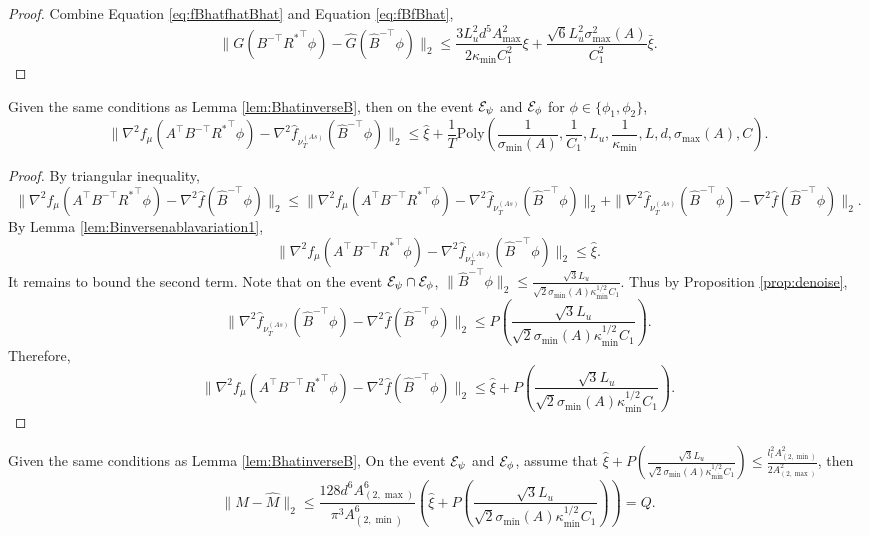 \begin{proof}
Combine Equation \eqref{eq:fBhatfhatBhat} and Equation \eqref{eq:fBfBhat},
\[
\|G(B^{-\top}{R^*}^{\top}\phi) - \hat{G}(\hat{B}^{-\top}\phi)\|_2
\le 
\frac{3L_u^2d^5A^2_{\max}}{2\kappa_{\min}C_1^2}\xi + \frac{\sqrt{6}L_u^2\sigma_{\max}^2(A)}{C_1^2}\bar{\xi}.
\]
\end{proof}

\begin{lemma}
\label{lem:Binversenablavariation2}
Given the same conditions as Lemma \ref{lem:BhatinverseB}, then on the event $\mathcal{E}_{\psi}$ and $\mathcal{E}_{\phi}$ for $\phi \in \{\phi_1, \phi_2\}$,
\[
\|\nabla^2 f_{\mu}(A^{\top}B^{-\top}{R^*}^{\top}\phi) - \nabla^2 \hat{f}_{\nu_T^{(As)}}(\hat{B}^{-\top}\phi)  \|_2 
\le
 \hat{\xi}
+
\frac{1}{T}\text{Poly}\left(\frac{1}{\sigma_{\min}(A)}, \frac{1}{C_1}, L_u, \frac{1}{\kappa_{\min}}, L, d, \sigma_{\max}(A), C\right).
\]
\end{lemma}
\begin{proof}
By triangular inequality, 
\[
\|\nabla^2 f_{\mu}(A^{\top}B^{-\top}{R^*}^{\top}\phi) - \nabla^2 \hat{f}(\hat{B}^{-\top}\phi)  \|_2 
\le 
\|\nabla^2 f_{\mu}(A^{\top}B^{-\top}{R^*}^{\top}\phi) - \nabla^2 \hat{f}_{\nu_T^{(As)}}(\hat{B}^{-\top}\phi)  \|_2 
+
\|\nabla^2 \hat{f}_{\nu_T^{(As)}}(\hat{B}^{-\top}\phi) - \nabla^2 \hat{f}(\hat{B}^{-\top}\phi)  \|_2. 
\]
By Lemma \ref{lem:Binversenablavariation1}, 
\[
\|\nabla^2 f_{\mu}(A^{\top}B^{-\top}{R^*}^{\top}\phi) - \nabla^2 \hat{f}_{\nu_T^{(As)}}(\hat{B}^{-\top}\phi)  \|_2 
\le \hat{\xi}. 
\]
It remains to bound the second term. 
Note that on the event $\mathcal{E}_{\psi}\cap\mathcal{E}_{\phi}$, $\|\hat{B}^{-\top}\phi\|_2 \le \frac{\sqrt{3}L_u}{\sqrt{2}\sigma_{\min}(A)\kappa_{\min}^{1/2}C_1}$. 
Thus by Proposition \ref{prop:denoise}, 
\[
\|\nabla^2 \hat{f}_{\nu_T^{(As)}}(\hat{B}^{-\top}\phi) - \nabla^2 \hat{f}(\hat{B}^{-\top}\phi)  \|_2 \le P\left(\frac{\sqrt{3}L_u}{\sqrt{2}\sigma_{\min}(A)\kappa_{\min}^{1/2}C_1}\right).
\]
Therefore, 
\[
\|\nabla^2 f_{\mu}(A^{\top}B^{-\top}{R^*}^{\top}\phi) - \nabla^2 \hat{f}(\hat{B}^{-\top}\phi)  \|_2 
\le 
 \hat{\xi}
+
P\left(\frac{\sqrt{3}L_u}{\sqrt{2}\sigma_{\min}(A)\kappa_{\min}^{1/2}C_1}\right).
\]
\end{proof}
\begin{lemma}
\label{lem:Tvariantion}
Given the same conditions as Lemma \ref{lem:BhatinverseB}, On the event $\mathcal{E}_{\psi}$ and $\mathcal{E}_{\phi}$, assume that $\hat{\xi}
+
P\left(\frac{\sqrt{3}L_u}{\sqrt{2}\sigma_{\min}(A)\kappa_{\min}^{1/2}C_1}\right)\le \frac{l_l^2 A^2_{(2,\min)}}{2A^2_{(2,\max)}}$, then 
\[
\|M - \hat{M}\|_2 \le  \frac{128d^6A^6_{(2,\max)}}{\pi^3 A^6_{(2,\min)}}\left(\hat{\xi}+
P\left(\frac{\sqrt{3}L_u}{\sqrt{2}\sigma_{\min}(A)\kappa_{\min}^{1/2}C_1}\right)\right) = Q.
\]
\end{lemma}

